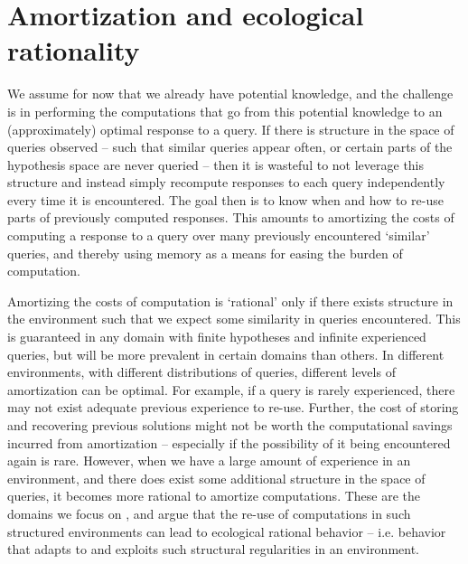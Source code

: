 \section{Amortization and ecological rationality}

We assume for now that we already have potential knowledge, and the challenge is in performing the computations that go from this potential knowledge to an (approximately) optimal response to a query. If there is structure in the space of queries observed -- such that similar queries appear often, or certain parts of the hypothesis space are never queried -- then it is wasteful to not leverage this structure and instead simply recompute responses to each query independently every time it is encountered. The goal then is to know when and how to re-use parts of previously computed responses. This amounts to amortizing the costs of computing a response to a query over many previously encountered `similar' queries, and thereby using memory as a means for easing the burden of computation.

Amortizing the costs of computation is `rational' only if there exists structure in the environment  such that we expect some similarity in queries encountered. This is guaranteed in any domain with finite hypotheses and infinite experienced queries, but will be more prevalent in certain domains than others. In different environments, with different distributions of queries, different levels of amortization can be optimal. For example, if a query is rarely experienced, there may not exist adequate previous experience to re-use. Further, the cost of storing and recovering previous solutions might not be worth the computational savings incurred from amortization -- especially if the possibility of it being encountered again is rare. However, when we have a large amount of experience in an environment, and there does exist some additional structure in the space of queries, it becomes more rational to amortize computations. These are the domains we focus on
, and argue that the re-use of computations in such structured environments can lead to ecological rational behavior -- i.e. behavior that adapts to and exploits such structural regularities in an environment. 

